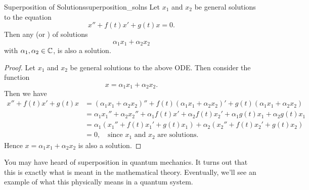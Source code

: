         \begin{thm}{Superposition of Solutions}{superposition_solns}
        Let $x_1$ and $x_2$ be general solutions to the equation
        \[
        x''+f(t)x'+g(t)x=0.
        \]
        Then any  (or ) of solutions
        \[
        \alpha_1 x_1 + \alpha_2 x_2
        \]
        with $\alpha_1,\alpha_2\in \mathbb{C}$, is also a solution.\\
        
        \begin{proof}
        Let $x_1$ and $x_2$ be general solutions to the above ODE. Then consider the function
        \[
        x=\alpha_1 x_1 + \alpha_2 x_2.
        \]
        Then we have
        \begin{align*}
            x''+f(t)x'+g(t)x&= (\alpha_1 x_1 + \alpha_2 x_2)''+f(t)(\alpha_1x_1+\alpha_2 x_2)'+g(t)(\alpha_1x_1+\alpha_2x_2)\\
            &= \alpha_1 x_1'' + \alpha_2 x_2'' + \alpha_1 f(t)x'+\alpha_2 f(t)x_2'+\alpha_1 g(t)x_1 + \alpha_2 g(t) x_1\\
            &= \alpha_1 ( x_1''+f(t)x_1'+g(t)x_1)+\alpha_2(x_2''+f(t)x_2'+g(t)x_2)\\
            &=0, \quad\textrm{since $x_1$ and $x_2$ are solutions.}
        \end{align*}
        Hence $x=\alpha_1x_1 + \alpha_2 x_2$ is also a solution.
        \end{proof}
        \end{thm}
        
        \begin{remark}
        You may have heard of superposition in quantum mechanics. It turns out that this is exactly what is meant in the mathematical theory. Eventually, we'll see an example of what this physically means in a quantum system.
        \end{remark}
        
